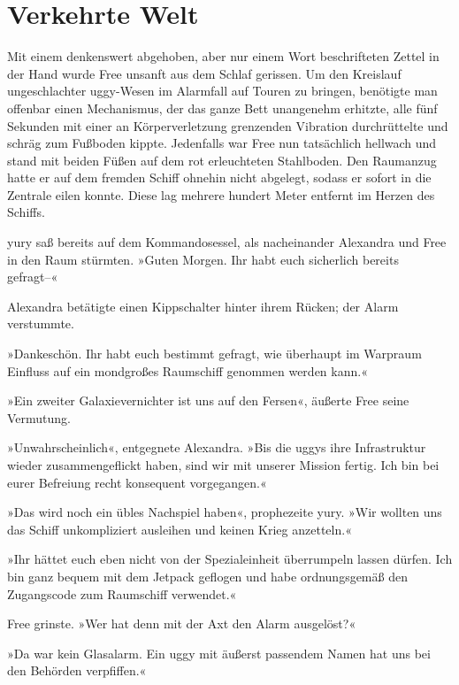 \chapter{Verkehrte Welt}

Mit einem denkenswert abgehoben, aber nur einem Wort beschrifteten Zettel in der Hand wurde Free unsanft aus dem Schlaf gerissen. Um den Kreislauf ungeschlachter uggy-Wesen im Alarmfall auf Touren zu bringen, benötigte man offenbar einen Mechanismus, der das ganze Bett unangenehm erhitzte, alle fünf Sekunden mit einer an Körperverletzung grenzenden Vibration durchrüttelte und schräg zum Fußboden kippte. Jedenfalls war Free nun tatsächlich hellwach und stand mit beiden Füßen auf dem rot erleuchteten Stahlboden. Den Raumanzug hatte er auf dem fremden Schiff ohnehin nicht abgelegt, sodass er sofort in die Zentrale eilen konnte. Diese lag mehrere hundert Meter entfernt im Herzen des Schiffs.


yury saß bereits auf dem Kommandosessel, als nacheinander Alexandra und Free in den Raum stürmten. »Guten Morgen. Ihr habt euch sicherlich bereits gefragt–«

 Alexandra betätigte einen Kippschalter hinter ihrem Rücken; der Alarm verstummte.

»Dankeschön. Ihr habt euch bestimmt gefragt, wie überhaupt im Warpraum Einfluss auf ein mondgroßes Raumschiff genommen werden kann.«

»Ein zweiter Galaxievernichter ist uns auf den Fersen«, äußerte Free seine Vermutung.

»Unwahrscheinlich«, entgegnete Alexandra. »Bis die uggys ihre Infrastruktur wieder zusammengeflickt haben, sind wir mit unserer Mission fertig. Ich bin bei eurer Befreiung recht konsequent vorgegangen.«

»Das wird noch ein übles Nachspiel haben«, prophezeite yury. »Wir wollten uns das Schiff unkompliziert ausleihen und keinen Krieg anzetteln.«

»Ihr hättet euch eben nicht von der Spezialeinheit überrumpeln lassen dürfen. Ich bin ganz bequem mit dem Jetpack geflogen und habe ordnungsgemäß den Zugangscode zum Raumschiff verwendet.«

Free grinste. »Wer hat denn mit der Axt den Alarm ausgelöst?«

»Da war kein Glasalarm. Ein uggy mit äußerst passendem Namen hat uns bei den Behörden verpfiffen.«

